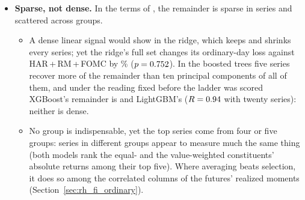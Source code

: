 \begin{itemize}
  on ordinary days, LightGBM and XGBoost refitted on HAR\,+\,RM\,+\,FOMC plus their own top five series recover
  shares of \rhbyLLgbmKFiveOrdR{} and \rhbyLXgbKFiveOrdR{} of the remaining gain (LightGBM's top series alone
  \rhbyLLgbmKOneOrdR), and ten principal components of the six remaining groups \rhbyFLgbmPcaTenOrdR{} and
  \rhbyFXgbPcaTenOrdR.
\item \textbf{Sparse, not dense.} In the terms of \citet{GiannoneLenzaPrimiceri2021}, the remainder is sparse in
  series and scattered across groups.
  \begin{itemize}
  \item A dense linear signal would show in the ridge, which keeps and shrinks every series; yet the ridge's full set
    changes its ordinary-day loss against HAR\,+\,RM\,+\,FOMC by \rhabRidgeFullVsAddRmFomcOrdPct\%
    ($p = 0.752$). In the boosted trees five series recover more of the remainder than ten
    principal components of all of them, and under the reading fixed before the ladder was scored XGBoost's
    remainder is \rhbyLXgbReading{} and LightGBM's \rhbyLLgbmReading{} ($R = 0.94$ with twenty
    series): neither is dense.
  \item No group is indispensable, yet the top series come from four or five groups: series in different groups
    appear to measure much the same thing (both models rank the equal- and the value-weighted constituents'
    absolute returns among their top five). Where averaging beats selection, it does so among the correlated
    columns of the futures' realized moments (Section~\ref{sec:rh_fi_ordinary}).
  \end{itemize}
\end{itemize}


